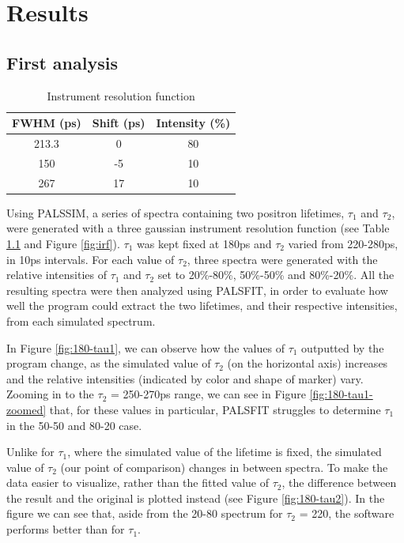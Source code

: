 \chapter{Results}

\section{First analysis}

\begin{table}
    \caption{Instrument resolution function}
    \centering
    \begin{tabular}{|c|c|c|}
        \hline
        FWHM (ps) &  Shift (ps) & Intensity (\%) \\
        \hline
        213.3 & 0 & 80\\ 
        150 & -5 & 10\\ 
        267 & 17 & 10\\  
        \hline
    \end{tabular}
    \label{tab:irf}
\end{table}

Using PALSSIM, a series of spectra containing two positron lifetimes, $\tau_1$ and $\tau_2$, were generated with a three gaussian instrument resolution function (see Table \ref{tab:irf} and Figure \ref{fig:irf}). $\tau_1$ was kept fixed at 180ps and $\tau_2$ varied from 220-280ps, in 10ps intervals. For each value of $\tau_2$, three spectra were generated with the relative intensities of $\tau_1$ and $\tau_2$ set to 20\%-80\%, 50\%-50\% and 80\%-20\%. All the resulting spectra were then analyzed using PALSFIT, in order to evaluate how well the program could extract the two lifetimes, and their respective intensities, from each simulated spectrum.

In Figure \ref{fig:180-tau1}, we can observe how the values of $\tau_1$ outputted by the program change, as the simulated value of $\tau_2$ (on the horizontal axis) increases and the relative intensities (indicated by color and shape of marker) vary. Zooming in to the $\tau_2$ = 250-270ps range, we can see in Figure \ref{fig:180-tau1-zoomed} that, for these values in particular, PALSFIT struggles to determine $\tau_1$ in the 50-50 and 80-20 case. 

Unlike for $\tau_1$, where the simulated value of the lifetime is fixed, the simulated value of $\tau_2$ (our point of comparison) changes in between spectra. To make the data easier to visualize, rather than the fitted value of $\tau_2$, the difference between the result and the original is plotted instead (see Figure \ref{fig:180-tau2}). In the figure we can see that, aside from the 20-80 spectrum for $\tau_2$ = 220, the software performs better than for $\tau_1$.

